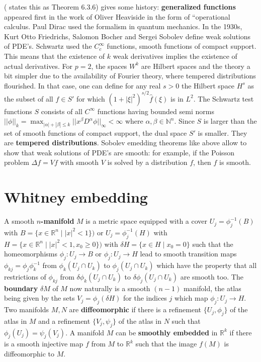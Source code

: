 \documentclass[12pt]{amsart}
\newcounter{example}    \def\example#1{ \item \fontsize{12}{15} \selectfont #1 \fontsize{12}{15} \selectfont }
\begin{document}
(\cite{Simon2017} states this as Theorem 6.3.6) gives some history: 
{\bf generalized functions} appeared first in the
work of Oliver Heaviside in the form of ``operational calculus. Paul Dirac used the
formalism in quantum mechanics. In the 1930s, 
Kurt Otto Friedrichs, Salomon Bocher and Sergei Sobolev define
weak solutions of PDE's. Schwartz used the $C_c^{\infty}$ functions, smooth functions
of compact support. 
This means that the existence of $k$ weak derivatives implies the existence
of actual derivatives. For $p=2$, the spaces $W^k$ are Hilbert spaces and the theory
a bit simpler due to the availability of Fourier theory, where tempered distributions flourished.
In that case, one can define for any real $s>0$ the Hilbert space
$H^s$ as the subset of all $f \in S'$ for which $(1+|\xi|^2)^{s/2} \hat{f}(\xi)$
is in $L^2$. The Schwartz test functions $S$ consists of all $C^{\infty}$ functions
having bounded semi norms
$||\phi||_k=\max_{|\alpha|+|\beta| \leq k} || x^{\beta} D^{\alpha} \phi||_{\infty}<\infty$
where $\alpha,\beta \in \mathbb{N}^n$. %
Since $S$ is larger than the set of smooth functions of compact support, the dual
space $S'$ is smaller. They are {\bf tempered distributions}.
Sobolev emedding theorems like above allow to show that weak solutions of PDE's are smooth:
for example, if the Poisson problem $\Delta f = V f$ with smooth 
$V$ is solved by a distribution $f$, then $f$ is smooth. 
\cite{Brezis2011,Simon2017}

\section{Whitney embedding}

A smooth {\bf $n$-manifold} $M$ is a metric space equipped
with a cover $U_j=\phi_j^{-1}(B)$ with $B=\{ x \in \mathbb{R}^n \; | \; |x|^2<1 \})$
or $U_j=\phi_j^{-1}(H)$ with $H=\{ x \in \mathbb{R}^n \; | \; |x|^2<1, x_0 \geq 0 \})$ with
$\delta H=\{ x \in H \; | \; x_0 = 0 \}$ such that
the homeomorphisms $\phi_j: U_j \to B$ or $\phi_j: U_j \to H$ lead to smooth transition maps
$\phi_{kj} =\phi_j \phi_k^{-1}$ from $\phi_k(U_j \cap U_k)$ to $\phi_j(U_j \cap U_k)$
which have the property that all restrictions of $\phi_{kj}$ from       
$\delta \phi_k(U_j \cap U_k)$ to $\delta \phi_j(U_j \cap U_k)$ are smooth too. The
{\bf boundary} $\delta M$ of $M$ now naturally is a smooth $(n-1)$ manifold, the atlas
being given by the sets $V_j = \phi_j(\delta H)$ for the indices $j$ which map $\phi_j: U_j \to H$. 
Two manifolds $M,N$ are {\bf diffeomorphic} if there is a refinement $\{ U_j,\phi_j \}$ of the atlas in $M$
and a refinement $\{V_j,\psi_j \}$ of the atlas in $N$ such that $\phi_j(U_j) = \psi_j(V_j)$.
A manifold $M$ can be {\bf smoothly embedded} in 
$\mathbb{R}^k$ if there is a smooth injective map $f$ from $M$ to $\mathbb{R}^k$ such that 
the image $f(M)$ is diffeomorphic to $M$. 
\end{document}
